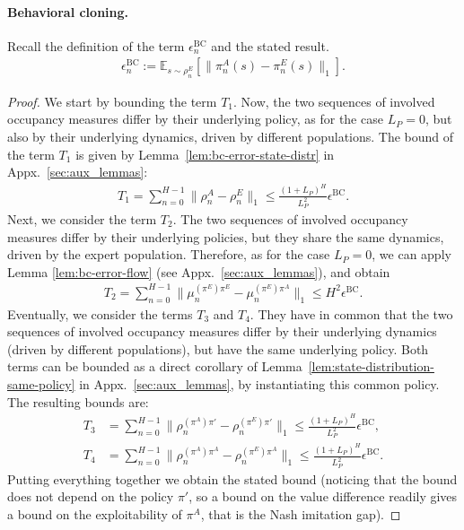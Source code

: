 \documentclass{article}
\begin{document}
\paragraph{Behavioral cloning.}  
Recall the definition of the term $\epsilon_n^\mathrm{BC}$ and the stated result.
\begin{align}
    \epsilon^\mathrm{BC}_n := \mathbb{E}_{s\sim \rho^E_n}\left[\| \pi^A_n(s) - \pi^E_n(s)\|_1\right].
\end{align}
\BCPopDep*
\begin{proof}
We start by bounding the term $T_1$. Now, the two sequences of involved occupancy measures differ by their underlying policy, as for the case $L_P=0$, but also by their underlying dynamics, driven by different populations. The bound of the term $T_1$ is given by Lemma~\ref{lem:bc-error-state-distr} in Appx.~\ref{sec:aux_lemmas}:
\begin{align}
    T_1 = \sum_{n=0}^{H-1} \|\rho^A_n - \rho^E_n\|_1 \le \frac{(1+L_P)^H}{L^2_P}\epsilon^\mathrm{BC}.
\end{align}
Next, we consider the term $T_2$. The two sequences of involved occupancy measures differ by their underlying policies, but they share the same dynamics, driven by the expert population. Therefore, as for the case $L_P=0$, we can apply Lemma \ref{lem:bc-error-flow} (see Appx.~\ref{sec:aux_lemmas}), and obtain
\begin{align}
    T_2 = \sum_{n=0}^{H-1} \|\mu_n^{(\pi^E)\pi^E} - \mu_n^{(\pi^E)\pi^A}\|_1 \le H^2 \epsilon^\mathrm{BC}.
\end{align}
Eventually, we consider the terms $T_3$ and $T_4$. They have in common that the two sequences of involved occupancy measures differ by their underlying dynamics (driven by different populations), but have the same underlying policy. Both terms can be bounded as a direct corollary of Lemma~\ref{lem:state-distribution-same-policy} in Appx.~\ref{sec:aux_lemmas}, by instantiating this common policy. The resulting bounds are:
\begin{align}
    T_3 &= \sum_{n=0}^{H-1}\|\rho_n^{(\pi^A)\pi'}-\rho_n^{(\pi^E)\pi'}\|_1 \le \frac{(1+L_P)^H}{L^2_P}\epsilon^\mathrm{BC},
    \\
     T_4 &= \sum_{n=0}^{H-1}\|\rho_n^{(\pi^A)\pi^A}-\rho_n^{(\pi^E)\pi^A}\|_1 \le \frac{(1+L_P)^H}{L^2_P}\epsilon^\mathrm{BC}.
\end{align}
Putting everything together we obtain the stated bound (noticing that the bound does not depend on the policy $\pi'$, so a bound on the value difference readily gives a bound on the exploitability of $\pi^A$, that is the Nash imitation gap).
\end{proof}
\end{document}
